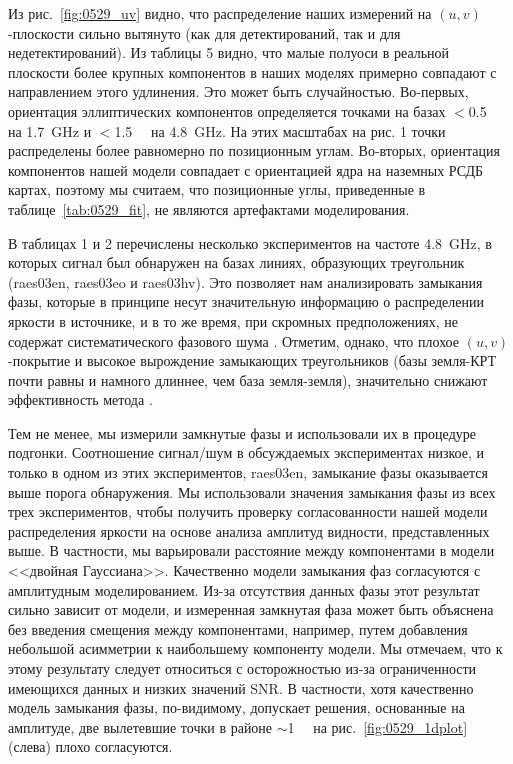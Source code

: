 Из рис.~\ref{fig:0529_uv} видно, что распределение наших измерений на $(u, v)$-плоскости сильно
вытянуто (как для детектирований, так и для недетектирований). Из таблицы 5 видно, что малые полуоси
в реальной плоскости более крупных компонентов в наших моделях примерно совпадают с направлением
этого удлинения. Это может быть случайностью. Во-первых, ориентация эллиптических компонентов
определяется точками на базах $<$\SI{0.5}{\giga\la} на \SI{1.7}{\GHz} и $<$\SI{1.5}{\giga\la} на
\SI{4.8}{\GHz}. На этих масштабах на рис. 1 точки распределены более равномерно по позиционным
углам. Во-вторых, ориентация компонентов нашей модели совпадает с ориентацией ядра на наземных РСДБ
картах, поэтому мы считаем, что позиционные углы, приведенные в таблице~\ref{tab:0529_fit}, не
являются артефактами моделирования.

В таблицах 1 и 2 перечислены несколько экспериментов на частоте \SI{4.8}{\GHz}, в которых сигнал
был обнаружен на базах линиях, образующих треугольник (raes03en, raes03eo и raes03hv). Это
позволяет нам анализировать замыкания фазы, которые в принципе несут значительную информацию о
распределении яркости в источнике, и в то же время, при скромных предположениях, не содержат
систематического фазового шума \cite{VLBIbook}. Отметим, однако, что плохое $(u, v)$-покрытие
и высокое вырождение замыкающих треугольников (базы земля-КРТ почти равны и намного
длиннее, чем база земля-земля), значительно снижают эффективность метода
\cite{Linfield_1986,Marti_Vidal_2008}.

Тем не менее, мы измерили замкнутые фазы и использовали их в процедуре подгонки. Соотношение
сигнал/шум в обсуждаемых экспериментах низкое, и только в одном из этих экспериментов, raes03en,
замыкание фазы оказывается выше порога обнаружения. Мы использовали значения замыкания фазы из всех
трех экспериментов, чтобы получить проверку согласованности нашей модели распределения яркости на
основе анализа амплитуд видности, представленных выше. В частности, мы варьировали расстояние
между компонентами в модели <<двойная Гауссиана>>. Качественно модели замыкания фаз согласуются с
амплитудным моделированием. Из-за отсутствия данных фазы этот результат сильно зависит от модели, и
измеренная замкнутая фаза может быть объяснена без введения смещения между компонентами, например,
путем добавления небольшой асимметрии к наибольшему компоненту модели. Мы отмечаем, что к этому
результату следует относиться с осторожностью из-за ограниченности имеющихся данных и низких
значений SNR. В частности, хотя качественно модель замыкания фазы, по-видимому, допускает решения,
основанные на амплитуде, две вылетевшие точки в районе $\sim$\SI{1}{\giga\la} на
рис.~\ref{fig:0529_1dplot} (слева) плохо согласуются.

